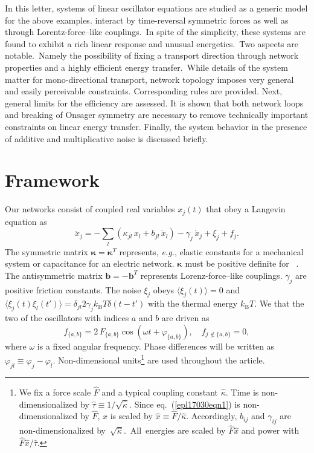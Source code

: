 \documentclass[doublecol,final,edchoice]{epl2}
\begin{document}
In this letter, systems of linear oscillator equations are studied as a generic model for the above examples.  interact by time-reversal symmetric forces as well as through Lorentz-force--like couplings.~In spite of the simplicity, these systems are found to exhibit a rich linear response and unusual energetics.~Two aspects are  notable.~Namely the possibility of fixing a transport direction through network properties and a highly efficient energy transfer.~While details of the system matter for mono-directional transport, network topology imposes very general and easily perceivable constraints. Corresponding rules are provided. Next, general limits for the efficiency are assessed. It is shown that both network loops and breaking of Onsager symmetry are necessary to remove technically important constraints on linear energy transfer. Finally, the system behavior in the presence of additive and multiplicative noise is discussed briefly.

\section{Framework}

Our networks consist of coupled real variables $x_j(t)$ that obey a Langevin equation as
\begin{equation}%
\ddot{x}_j = -\sum_l\left(\kappa_{jl}\,x_l + b_{jl}\,\dot{x}_l\right)-\gamma_j\,\dot{x}_j + \xi_j + f_j.
\label{epl17030eqn1}
\end{equation}
The symmetric matrix $\bm{\kappa}=\bm{\kappa}^{T}$ represents, \textit{e.g.}, elastic constants for a mechanical system or capacitance for an electric network. $\bm{\kappa}$ must be positive definite for ~\cite{epl17030bib14}. The antisymmetric matrix $\mathbf{b} = -\mathbf{b}^{T}$ represents Lorenz-force--like couplings. $\gamma_j$ are positive friction constants. The noise $\xi_j$ obeys $\langle\xi_j(t)\rangle = 0$ and $\langle \xi_j(t) \xi_l(t')\rangle = \delta_{jl} 2 \gamma_j k_{\text{B}}T \delta(t-t')$ with the thermal energy $k_{\text{B}}T$. We  that the two of the oscillators with indices $a$ and $b$ are driven as
\begin{equation}%
f_{\{a,b\}} = 2\,F_{\{a,b\}} \cos(\omega t + \varphi_{\{a,b\}}), \quad f_{j\,\notin \{a,b\}} = 0,
\label{epl17030eqn2}
\end{equation}
where $\omega$ is a fixed angular frequency. Phase differences will be written as $\varphi_{jl}\equiv\varphi_{j}-\varphi_{l}$. Non-dimensional units\footnote{We fix a force scale $\hat{F}$ and a typical coupling constant $\hat{\kappa}$. Time is non-dimensionalized by $\hat{\tau} \equiv 1/\sqrt{\hat{\kappa}}$. Since eq.~(\ref{epl17030eqn1}) is non-dimensionalized by $\hat{F}$, $x$ is scaled by $\hat{x} \equiv \hat{F}/\hat{\kappa}$. Accordingly, $b_{ij}$ and $\gamma_{ij}$ are non-dimensionalized by~$\sqrt{\hat{\kappa}}$.~All~energies are scaled by $\hat{F} \hat{x}$ and power with $\hat{F} \hat{x} /\hat{\tau}$.} are used throughout the article.
\end{document}
